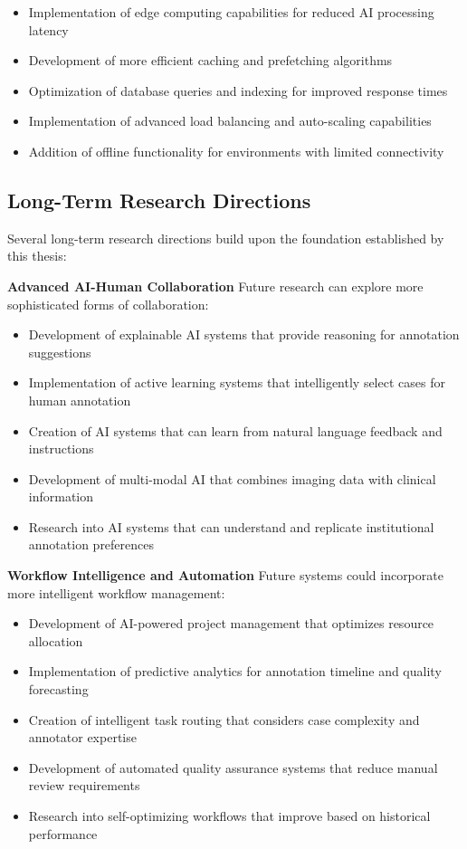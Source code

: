 \begin{itemize}
    \item Implementation of edge computing capabilities for reduced AI processing latency
    \item Development of more efficient caching and prefetching algorithms
    \item Optimization of database queries and indexing for improved response times
    \item Implementation of advanced load balancing and auto-scaling capabilities
    \item Addition of offline functionality for environments with limited connectivity
\end{itemize}

\subsection{Long-Term Research Directions}

Several long-term research directions build upon the foundation established by this thesis:

\textbf{Advanced AI-Human Collaboration}
Future research can explore more sophisticated forms of collaboration:

\begin{itemize}
    \item Development of explainable AI systems that provide reasoning for annotation suggestions
    \item Implementation of active learning systems that intelligently select cases for human annotation
    \item Creation of AI systems that can learn from natural language feedback and instructions
    \item Development of multi-modal AI that combines imaging data with clinical information
    \item Research into AI systems that can understand and replicate institutional annotation preferences
\end{itemize}

\textbf{Workflow Intelligence and Automation}
Future systems could incorporate more intelligent workflow management:

\begin{itemize}
    \item Development of AI-powered project management that optimizes resource allocation
    \item Implementation of predictive analytics for annotation timeline and quality forecasting
    \item Creation of intelligent task routing that considers case complexity and annotator expertise
    \item Development of automated quality assurance systems that reduce manual review requirements
    \item Research into self-optimizing workflows that improve based on historical performance
\end{itemize}

